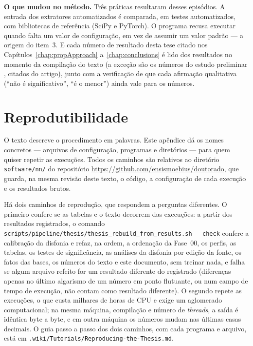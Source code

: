 \begin{apendicesenv}
		\par \textbf{O que mudou no método.} Três práticas resultaram desses episódios.
		A entrada dos extratores automatizados é comparada, em testes automatizados,
		com bibliotecas de referência (SciPy e PyTorch). O programa recusa executar
		quando falta um valor de configuração, em vez de assumir um valor padrão --- a
		origem do item~3. E cada número de resultado desta tese citado nos
		Capítulos~\ref{chap:propApproach} a~\ref{chap:conclusions} é lido dos
		resultados no momento da compilação do texto (a exceção são os números do
		estudo preliminar \cite{furlan2026spiking}, citados do artigo), junto com a verificação de que cada afirmação qualitativa (``não é
		significativo'', ``é o menor'') ainda vale para os números.

	\chapter{Reprodutibilidade}
	\label{apend:reprodutibilidade}

		\par O texto descreve o procedimento em palavras. Este apêndice dá os nomes
		concretos --- arquivos de configuração, programas e diretórios --- para quem
		quiser repetir as execuções. Todos os caminhos são relativos ao diretório
		\texttt{software/nn/} do repositório \url{https://github.com/ensismoebius/doutorado},
		que guarda, na mesma revisão deste texto, o código, a configuração de cada
		execução e os resultados brutos.

		\par Há dois caminhos de reprodução, que respondem a perguntas diferentes. O
		primeiro confere se as tabelas e o texto decorrem das execuções: a partir dos
		resultados registrados, o comando
		\texttt{scripts/\allowbreak pipeline/\allowbreak thesis/\allowbreak thesis\_rebuild\_\allowbreak from\_\allowbreak results.sh -{}-check}
		confere a calibração da disfonia e refaz, na ordem, a ordenação da Fase~00, os
		perfis, as tabelas, os testes de significância, as análises da disfonia por edição
		da fonte, os fatos das bases, os números do texto e este documento, sem treinar
		nada, e falha se algum arquivo refeito for um resultado diferente do registrado
		(diferenças apenas no último algarismo de um número em ponto flutuante, ou num
		campo de tempo de execução, não contam como resultado diferente). O segundo repete as
		execuções, o que custa milhares de horas de CPU e exige um aglomerado
		computacional; na mesma máquina, compilação e número de \textit{threads}, a
		saída é idêntica byte a byte, e em outra máquina os números mudam nas últimas
		casas decimais. O guia passo a passo dos dois caminhos, com cada programa e
		arquivo, está em \texttt{.wiki/\allowbreak Tutorials/\allowbreak Reproducing-\allowbreak the-\allowbreak Thesis.md}.


\end{apendicesenv}
